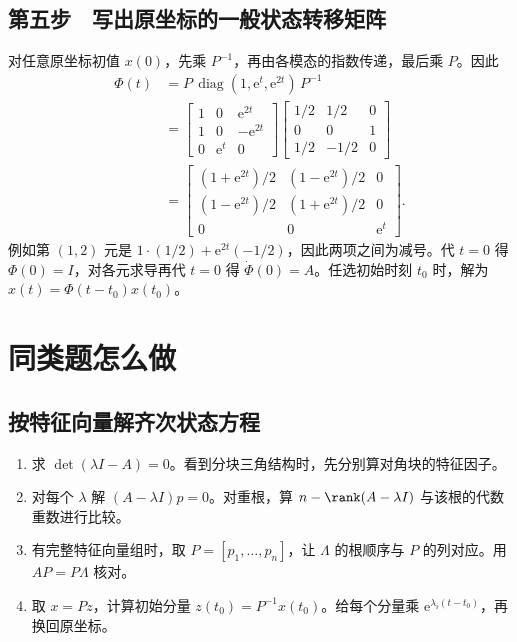 \subsection{第五步　写出原坐标的一般状态转移矩阵}

对任意原坐标初值 $x(0)$，先乘 $P^{-1}$，再由各模态的指数传递，最后乘 $P$。因此
\[
\begin{aligned}
 \Phi(t)
 &=P\,\operatorname{diag}(1,\mathrm e^t,\mathrm e^{2t})\,P^{-1}\\
 &=\begin{bmatrix}1&0&\mathrm e^{2t}\\1&0&-\mathrm e^{2t}\\0&\mathrm e^t&0\end{bmatrix}
   \begin{bmatrix}1/2&1/2&0\\0&0&1\\1/2&-1/2&0\end{bmatrix}\\
 &=\begin{bmatrix}
 (1+\mathrm e^{2t})/2&(1-\mathrm e^{2t})/2&0\\
 (1-\mathrm e^{2t})/2&(1+\mathrm e^{2t})/2&0\\
 0&0&\mathrm e^t
 \end{bmatrix}.
\end{aligned}
\]
例如第 $(1,2)$ 元是 $1\cdot(1/2)+\mathrm e^{2t}(-1/2)$，因此两项之间为减号。代 $t=0$ 得 $\Phi(0)=I$，对各元求导再代 $t=0$ 得 $\dot\Phi(0)=A$。任选初始时刻 $t_0$ 时，解为 $x(t)=\Phi(t-t_0)x(t_0)$。

\section{同类题怎么做}

\subsection{按特征向量解齐次状态方程}

\begin{enumerate}
 \item 求 $\det(\lambda I-A)=0$。看到分块三角结构时，先分别算对角块的特征因子。
 \item 对每个 $\lambda$ 解 $(A-\lambda I)p=0$。对重根，算 $n-\rank(A-\lambda I)$ 与该根的代数重数进行比较。
 \item 有完整特征向量组时，取 $P=[p_1,\ldots,p_n]$，让 $\Lambda$ 的根顺序与 $P$ 的列对应。用 $AP=P\Lambda$ 核对。
 \item 取 $x=Pz$，计算初始分量 $z(t_0)=P^{-1}x(t_0)$。给每个分量乘 $\mathrm e^{\lambda_i(t-t_0)}$，再换回原坐标。
\end{enumerate}

